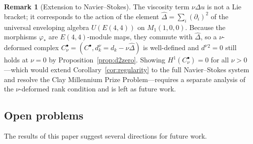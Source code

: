 \documentclass[reqno,10pt]{amsart}
\theoremstyle{definition}
\newtheorem{rem}[subsubsection]{Remark}
\begin{document}
\begin{rem}[Extension to Navier--Stokes]\label{rem:ns-extension}
The viscosity term $\nu\Delta u$ is not a Lie bracket; it corresponds to
the action of the element $\hat{\Delta} = \sum_i (\partial_i)^2$ of the
universal enveloping algebra $U(E(4,4))$ on $M_1(1,0,0)$.  Because the
morphisms $\varphi_*$ are $E(4,4)$-module maps, they commute with
$\hat{\Delta}$, so a $\nu$-deformed complex
$C^\bullet_\nu = (C^\bullet, d^\nu_k = d_k - \nu\hat{\Delta})$ is
well-defined and $d^\nu{}^2 = 0$ still holds at $\nu=0$ by
Proposition~\ref{prop:d2zero}.  Showing $H^1(C^\bullet_\nu) = 0$ for
all $\nu > 0$---which would extend Corollary~\ref{cor:regularity} to the
full Navier--Stokes system and resolve the Clay Millennium Prize
Problem---requires a separate analysis of the $\nu$-deformed rank
condition and is left as future work.
\end{rem}

\subsection*{Open problems}

The results of this paper suggest several directions for future work.
\end{document}
